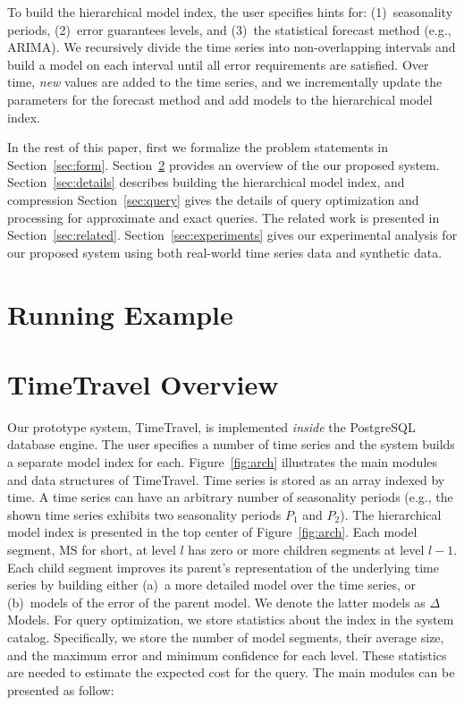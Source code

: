 \documentclass[10pt,conference,letterpaper]{IEEEtran}
\newcommand{\LNs}{hierarchical model index }
\begin{document}
To build the hierarchical model index, the user specifies hints for: (1)~seasonality periods, (2)~error guarantees levels, and (3)~the statistical forecast method (e.g., ARIMA).  
We recursively divide the time series into non-overlapping intervals and build a model on each interval until all error requirements are satisfied. 
Over time, {\it new} values are added to the time series, and we incrementally update the parameters for the forecast method and add  models to the hierarchical model index.


In the rest of this paper, first we formalize the problem statements in Section~\ref{sec:form}.   Section~\ref{sec:overview} provides an overview of the our proposed system. Section~\ref{sec:details} describes building the hierarchical model index, and  compression Section~\ref{sec:query} gives the details of query optimization and processing for approximate and exact queries.  The  related work is presented in Section~\ref{sec:related}. Section~\ref{sec:experiments} gives  our experimental analysis for our proposed system   using  both real-world time series data and synthetic data.

\section{Running Example}

\section{TimeTravel Overview}
\label{sec:overview}
Our prototype  system, TimeTravel, is implemented {\em inside} the PostgreSQL database engine.  The user specifies a number of time series and the system builds a separate model index for each. Figure~\ref{fig:arch} illustrates the main modules and data structures of TimeTravel. {Time series} is stored as an array indexed by time. A time series can have an arbitrary number of seasonality periods (e.g., the shown time series exhibits two seasonality periods $P_1$ and $P_2$). The \LNs is presented in the top center of Figure~\ref{fig:arch}. Each model segment, MS for short, at level $l$ has zero or more children segments at level $l-1$.  Each child segment improves its parent's representation of the underlying time series by building either (a)~a more detailed model over the time series, 
or (b)~models of the error of the parent model. We denote the latter models as $\Delta$Models. 
For query optimization, we store statistics about the index in the system catalog. Specifically, we store the number of model segments, their average size, and the maximum error and minimum confidence for each level. These statistics are needed to estimate the expected cost for the query.
The main modules  can be presented as follow:
\end{document}
